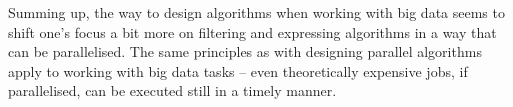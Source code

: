 Summing up, the way to design algorithms when working with big data seems to shift one's focus a bit more on filtering and expressing algorithms in a way that can be parallelised. The same principles as with designing parallel algorithms apply to working with big data tasks -- even theoretically expensive jobs, if parallelised, can be executed still in a timely manner.















